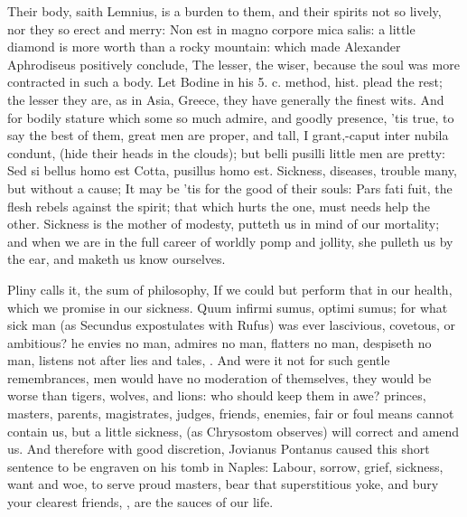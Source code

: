 {Their body, saith Lemnius, is a burden to them, and their spirits
not so lively, nor they so erect and merry: Non est in magno corpore
mica salis: a little diamond is more worth than a rocky mountain: which
made Alexander Aphrodiseus positively conclude, The lesser, the
wiser, because the soul was more contracted in such a body. Let
Bodine in his 5. c. method, hist. plead the rest; the lesser they are,
as in Asia, Greece, they have generally the finest wits. And for bodily
stature which some so much admire, and goodly presence, 'tis true, to
say the best of them, great men are proper, and tall, I grant,-caput
inter nubila condunt, (hide their heads in the clouds); but belli
pusilli little men are pretty: Sed si bellus homo est Cotta, pusillus
homo est. Sickness, diseases, trouble many, but without a cause;
It may be 'tis for the good of their souls: Pars fati fuit, the
flesh rebels against the spirit; that which hurts the one, must needs
help the other. Sickness is the mother of modesty, putteth us in mind
of our mortality; and when we are in the full career of worldly pomp
and jollity, she pulleth us by the ear, and maketh us know ourselves.

Pliny calls it, the sum of philosophy, If we could but perform
that in our health, which we promise in our sickness. Quum infirmi
sumus, optimi sumus; for what sick man (as  Secundus
expostulates with Rufus) was ever lascivious, covetous, or ambitious?
he envies no man, admires no man, flatters no man, despiseth no man,
listens not after lies and tales, \etc{}. And were it not for such gentle
remembrances, men would have no moderation of themselves, they would be
worse than tigers, wolves, and lions: who should keep them in awe?
princes, masters, parents, magistrates, judges, friends, enemies, fair
or foul means cannot contain us, but a little sickness, (as
Chrysostom observes) will correct and amend us. And therefore
with good discretion, Jovianus Pontanus caused this short
sentence to be engraven on his tomb in Naples: Labour, sorrow, grief,
sickness, want and woe, to serve proud masters, bear that superstitious
yoke, and bury your clearest friends, \etc{}, are the sauces of our life.

}
